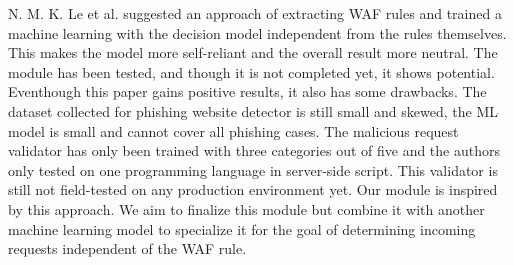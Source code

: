 N. M. K. Le et al. \cite{Khoi} suggested an approach of extracting WAF rules and trained a machine learning with the decision model independent from the rules themselves. This makes the model more self-reliant and the overall result more neutral. The module has been tested, and though it is not completed yet, it shows potential. Eventhough this paper gains positive results, it also has some drawbacks. The dataset collected for phishing website detector is still small and skewed, the ML model is small and cannot cover all phishing cases. The malicious request validator has only been trained with three categories out of five and the authors only tested on one programming language in server-side script. This validator is still not field-tested on any production environment yet. Our module is inspired by this approach. We aim to finalize this module but combine it with another machine learning model to specialize it for the goal of determining incoming requests independent of the WAF rule.
